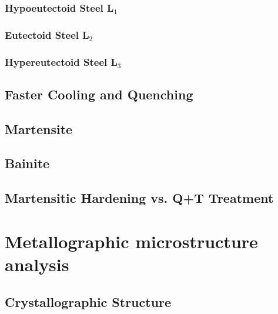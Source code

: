 \documentclass{article}
\begin{document}
\subsubsection{Hypoeutectoid Steel L$_1$}

\subsubsection{Eutectoid Steel L$_2$}

\subsubsection{Hypereutectoid Steel L$_3$}

\subsection{Faster Cooling and Quenching}

\subsection{Martensite}

\subsection{Bainite}

\subsection{Martensitic Hardening vs. Q+T Treatment}

\section{Metallographic microstructure analysis}
\subsection{Crystallographic Structure}







\newpage
\appendix
\printacronyms[name=Glossary, heading=section]
\newpage

\vspace*{-1cm}
\printnomenclature
\end{document}
